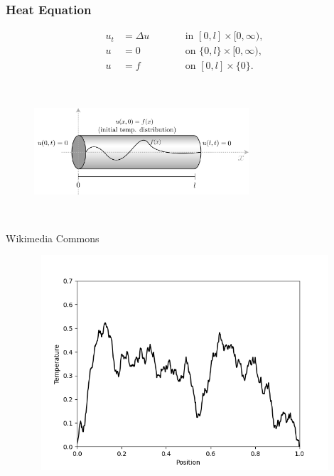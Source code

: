 \documentclass{beamer}
\begin{document}
\begin{frame}
\frametitle{Heat Equation}
\begin{subequations}
  \begin{align*}
    u_t &= \Delta u &&\qquad \text{in } [0,l] \times [0,\infty),\\
    u &= 0 &&\qquad \text{on } \{0, l\} \times [0,\infty),\\
    u &= f &&\qquad \text{on }[0,l] \times \{0\}.
  \end{align*}
\end{subequations}

\begin{figure}
  \centering
  \includegraphics[width=8cm,height=5cm]{figs/heat_rod.png} 
\end{figure}

\footnotesize{Wikimedia Commons}
\end{frame}


\begin{frame}
  \begin{figure}
    \centering
    \href{run:figs/forward_heat_equation.mp4}{\includegraphics[width=12cm,height=8cm]{figs/forward_heat_equation.png}}    
    
  \end{figure}
\end{frame}
\end{document}
